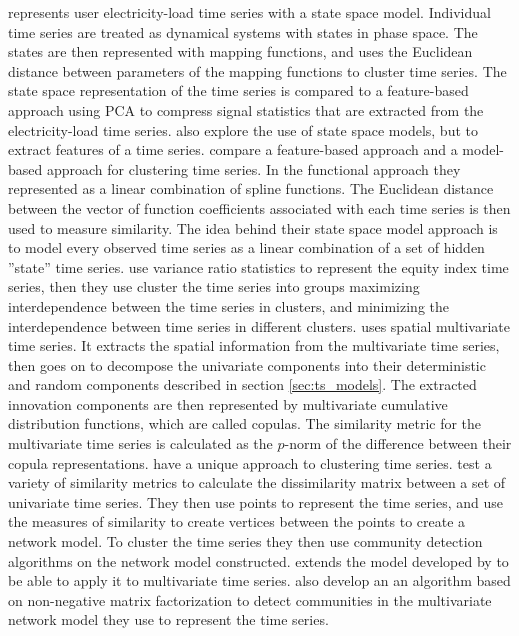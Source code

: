 \textcite{load_tsc_state_space_model} represents user electricity-load time series with a state space model. Individual time series are treated as dynamical systems with states in phase space. 
The states are then represented with mapping functions, and uses the Euclidean distance between parameters of the mapping functions to cluster time series.
The state space representation of the time series is compared to a feature-based approach using PCA to compress signal statistics that are extracted from the electricity-load time series.
\textcite{stock_price_tsc_regr_trees_som} also explore the use of state space models, but to extract features of a time series.
\textcite{hier_clust_w_state_space_models} compare a feature-based approach and a model-based approach for clustering time series. 
In the functional approach they represented as a linear combination of spline functions. 
The Euclidean distance between the vector of function coefficients associated with each time series is then used to measure similarity.
The idea behind their state space model approach is to model every observed time series as a linear combination of a set of hidden ''state'' time series. 
\textcite{financial_tsc_variance_ratio} use variance ratio statistics to represent the equity index time series, then they use cluster the time series into groups maximizing interdependence between the time series in clusters, and minimizing the interdependence between time series in different clusters. 
\textcite{copula_fuzzy_tsc_spatial} uses spatial multivariate time series. 
It extracts the spatial information from the multivariate time series, then goes on to decompose the univariate components into their deterministic and random components described in section \ref{sec:ts_models}.
The extracted innovation components are then represented by multivariate cumulative distribution functions, which are called copulas. 
The similarity metric for the multivariate time series is calculated as the $p$-norm of the difference between their copula representations.
\textcite{community_detection_networks_tsc, multivar_tsc_community_detection} have a unique approach to clustering time series. 
\textcite{community_detection_networks_tsc} test a variety of similarity metrics to calculate the dissimilarity matrix between a set of univariate time series. 
They then use points to represent the time series, and use the measures of similarity to create vertices between the points to create a network model. 
To cluster the time series they then use community detection algorithms on the network model constructed. 
\textcite{multivar_tsc_community_detection} extends the model developed by \textcite{community_detection_networks_tsc} to be able to apply it to multivariate time series.
\textcite{multivar_tsc_community_detection} also develop an an algorithm based on non-negative matrix factorization to detect communities in the multivariate network model they use to represent the time series.

